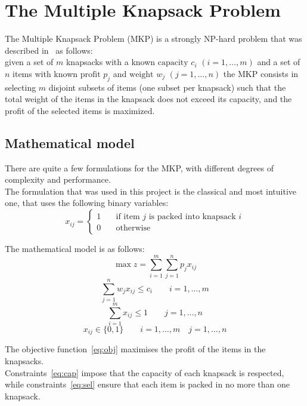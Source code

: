 \chapter{The Multiple Knapsack Problem}
The Multiple Knapsack Problem (MKP) is a strongly NP-hard problem that was described in~\cite{mkp:2019} as follows:\\
given a set of \(m\) knapsacks with a known \(\text{capacity } c_{i}\) \((i=1,\dots,m)\) and a set of \(n\) items with
known \(\text{profit } p_{j}\) and \(\text{weight } w_{j}\) \((j=1,\dots,n)\) the MKP consists in
selecting \(m\) disjoint subsets of items (one subset per knapsack) such that the total weight of the items in the knapsack
does not exceed its capacity, and the profit of the selected items is maximized.

\section{Mathematical model}
There are quite a few formulations for the MKP, with different degrees of
complexity and performance.\\
The formulation that was used in this project is the classical and most intuitive
one, that uses the following binary variables:
\[x_{ij}=
\begin{cases}
    1 & \quad \text{if item } j \text{ is packed into knapsack } i\\
    0 & \quad \text{otherwise}
\end{cases}
\]

The mathematical model is as follows:
\begin{equation}
    \label{eq:obj}
    \max{z} = \sum_{i=1}^{m} \sum_{j=1}^{n} p_{j} x_{ij}
\end{equation}
\begin{equation}
    \label{eq:cap}
    \sum_{j=1}^{n} w_{j} x_{ij} \leq c_{i} \qquad i=1,\dots,m
\end{equation}
\begin{equation}
    \label{eq:sel}
    \sum_{i=1}^{m} x_{ij} \leq 1 \qquad j=1,\dots,n
\end{equation}
\begin{equation}
    x_{ij} \in \{0,1\} \qquad i=1,\dots,m \quad j=1,\dots,n
\end{equation}

The objective function~\eqref{eq:obj} maximises the profit of the items in the knapsacks.\\
Constraints~\eqref{eq:cap} impose that the capacity of each knapsack is respected, while constraints~\eqref{eq:sel}
ensure that each item is packed in no more than one knapsack.

